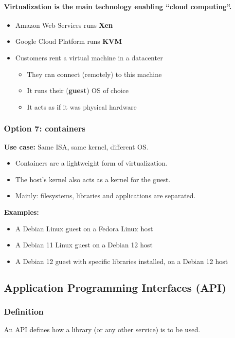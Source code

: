 \documentclass[12pt]{article}
\begin{document}
\paragraph{Virtualization is the main technology enabling ``cloud computing''.}

\begin{itemize}
  \item Amazon Web Services runs \textbf{Xen}
  \item Google Cloud Platform runs \textbf{KVM}
  \item Customers rent a virtual machine in a datacenter
  \begin{itemize}
    \item They can connect (remotely) to this machine
    \item It runs their (\textbf{guest}) OS of choice
    \item It acts as if it was physical hardware
  \end{itemize}
\end{itemize}

\subsubsection{Option 7: containers}
\textbf{Use case:} Same ISA, same kernel, different OS.

\begin{itemize}
  \item Containers are a lightweight form of virtualization.
  \item The host's kernel also acts as a kernel for the guest.
  \item Mainly: filesystems, libraries and applications are separated.
\end{itemize}

\textbf{Examples:}
\begin{itemize}
  \item A Debian Linux guest on a Fedora Linux host
  \item A Debian 11 Linux guest on a Debian 12 host
  \item A Debian 12 guest with specific libraries installed, on a Debian 12 host
\end{itemize}

\subsection{Application Programming Interfaces (API)}

\subsubsection{Definition}
An API defines how a library (or any other service) is to be used.
\end{document}
